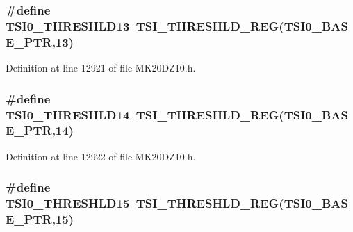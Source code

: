 \subsubsection[{\texorpdfstring{T\+S\+I0\+\_\+\+T\+H\+R\+E\+S\+H\+L\+D13}{TSI0_THRESHLD13}}]{\setlength{\rightskip}{0pt plus 5cm}\#define T\+S\+I0\+\_\+\+T\+H\+R\+E\+S\+H\+L\+D13~{\bf T\+S\+I\+\_\+\+T\+H\+R\+E\+S\+H\+L\+D\+\_\+\+R\+EG}({\bf T\+S\+I0\+\_\+\+B\+A\+S\+E\+\_\+\+P\+TR},13)}\hypertarget{group___t_s_i___register___accessor___macros_ga10517c6546b38a0b3a412568b7ad1335}{}\label{group___t_s_i___register___accessor___macros_ga10517c6546b38a0b3a412568b7ad1335}


Definition at line 12921 of file M\+K20\+D\+Z10.\+h.

\subsubsection[{\texorpdfstring{T\+S\+I0\+\_\+\+T\+H\+R\+E\+S\+H\+L\+D14}{TSI0_THRESHLD14}}]{\setlength{\rightskip}{0pt plus 5cm}\#define T\+S\+I0\+\_\+\+T\+H\+R\+E\+S\+H\+L\+D14~{\bf T\+S\+I\+\_\+\+T\+H\+R\+E\+S\+H\+L\+D\+\_\+\+R\+EG}({\bf T\+S\+I0\+\_\+\+B\+A\+S\+E\+\_\+\+P\+TR},14)}\hypertarget{group___t_s_i___register___accessor___macros_gaad652b44d37eb84d2dc43dff53280914}{}\label{group___t_s_i___register___accessor___macros_gaad652b44d37eb84d2dc43dff53280914}


Definition at line 12922 of file M\+K20\+D\+Z10.\+h.

\subsubsection[{\texorpdfstring{T\+S\+I0\+\_\+\+T\+H\+R\+E\+S\+H\+L\+D15}{TSI0_THRESHLD15}}]{\setlength{\rightskip}{0pt plus 5cm}\#define T\+S\+I0\+\_\+\+T\+H\+R\+E\+S\+H\+L\+D15~{\bf T\+S\+I\+\_\+\+T\+H\+R\+E\+S\+H\+L\+D\+\_\+\+R\+EG}({\bf T\+S\+I0\+\_\+\+B\+A\+S\+E\+\_\+\+P\+TR},15)}\hypertarget{group___t_s_i___register___accessor___macros_ga1fe2257d2fe4a63dd56d95a8e601e33d}{}\label{group___t_s_i___register___accessor___macros_ga1fe2257d2fe4a63dd56d95a8e601e33d}


